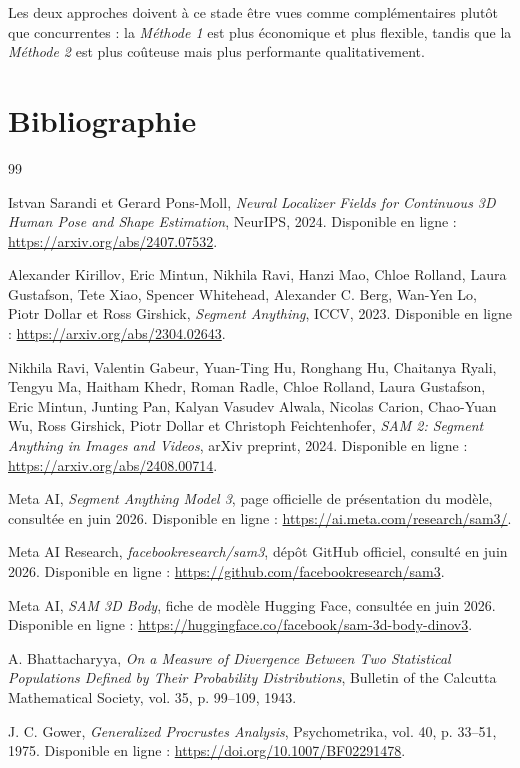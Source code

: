 \documentclass[11pt,a4paper]{article}
\begin{document}
Les deux approches doivent à ce stade être vues comme complémentaires plutôt que concurrentes : la \textit{Méthode 1} est plus économique et plus flexible, tandis que la \textit{Méthode 2} est plus coûteuse mais plus performante qualitativement.

\newpage
\section*{Bibliographie}

\begin{thebibliography}{99}

Istvan Sarandi et Gerard Pons-Moll,
\textit{Neural Localizer Fields for Continuous 3D Human Pose and Shape Estimation},
NeurIPS, 2024.
Disponible en ligne : \url{https://arxiv.org/abs/2407.07532}.

Alexander Kirillov, Eric Mintun, Nikhila Ravi, Hanzi Mao, Chloe Rolland, Laura Gustafson, Tete Xiao, Spencer Whitehead, Alexander C. Berg, Wan-Yen Lo, Piotr Dollar et Ross Girshick,
\textit{Segment Anything},
ICCV, 2023.
Disponible en ligne : \url{https://arxiv.org/abs/2304.02643}.

Nikhila Ravi, Valentin Gabeur, Yuan-Ting Hu, Ronghang Hu, Chaitanya Ryali, Tengyu Ma, Haitham Khedr, Roman Radle, Chloe Rolland, Laura Gustafson, Eric Mintun, Junting Pan, Kalyan Vasudev Alwala, Nicolas Carion, Chao-Yuan Wu, Ross Girshick, Piotr Dollar et Christoph Feichtenhofer,
\textit{SAM 2: Segment Anything in Images and Videos},
arXiv preprint, 2024.
Disponible en ligne : \url{https://arxiv.org/abs/2408.00714}.

Meta AI,
\textit{Segment Anything Model 3},
page officielle de présentation du modèle, consultée en juin 2026.
Disponible en ligne : \url{https://ai.meta.com/research/sam3/}.

Meta AI Research,
\textit{facebookresearch/sam3},
dépôt GitHub officiel, consulté en juin 2026.
Disponible en ligne : \url{https://github.com/facebookresearch/sam3}.

Meta AI,
\textit{SAM 3D Body},
fiche de modèle Hugging Face, consultée en juin 2026.
Disponible en ligne : \url{https://huggingface.co/facebook/sam-3d-body-dinov3}.

A. Bhattacharyya,
\textit{On a Measure of Divergence Between Two Statistical Populations Defined by Their Probability Distributions},
Bulletin of the Calcutta Mathematical Society, vol. 35, p. 99--109, 1943.

J. C. Gower,
\textit{Generalized Procrustes Analysis},
Psychometrika, vol. 40, p. 33--51, 1975.
Disponible en ligne : \url{https://doi.org/10.1007/BF02291478}.

\end{thebibliography}
\end{document}

